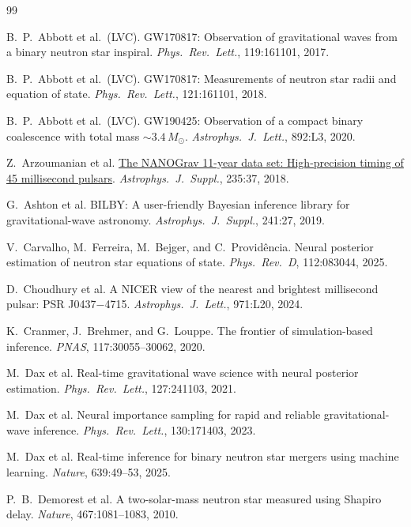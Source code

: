 \documentclass{article}
\newcommand{\Msun}{M_\odot}
\begin{document}
\begin{thebibliography}{99}\small\setlength\itemsep{0pt}

 B.~P.~Abbott et al.\ (LVC). GW170817: Observation of gravitational waves from a binary neutron star inspiral. \emph{Phys.\ Rev.\ Lett.}, 119:161101, 2017.

 B.~P.~Abbott et al.\ (LVC). GW170817: Measurements of neutron star radii and equation of state. \emph{Phys.\ Rev.\ Lett.}, 121:161101, 2018.

 B.~P.~Abbott et al.\ (LVC). GW190425: Observation of a compact binary coalescence with total mass $\sim3.4\,\Msun$. \emph{Astrophys.\ J.\ Lett.}, 892:L3, 2020.

 Z.~Arzoumanian et al. \href{https://doi.org/10.3847/1538-4365/aab5b0}{The NANOGrav 11-year data set: High-precision timing of 45 millisecond pulsars}. \emph{Astrophys.\ J.\ Suppl.}, 235:37, 2018.

 G.~Ashton et al. BILBY: A user-friendly Bayesian inference library for gravitational-wave astronomy. \emph{Astrophys.\ J.\ Suppl.}, 241:27, 2019.

 V.~Carvalho, M.~Ferreira, M.~Bejger, and C.~Provid\^encia. Neural posterior estimation of neutron star equations of state. \emph{Phys.\ Rev.\ D}, 112:083044, 2025.

 D.~Choudhury et al. A NICER view of the nearest and brightest millisecond pulsar: PSR J0437$-$4715. \emph{Astrophys.\ J.\ Lett.}, 971:L20, 2024.

 K.~Cranmer, J.~Brehmer, and G.~Louppe. The frontier of simulation-based inference. \emph{PNAS}, 117:30055--30062, 2020.

 M.~Dax et al. Real-time gravitational wave science with neural posterior estimation. \emph{Phys.\ Rev.\ Lett.}, 127:241103, 2021.

 M.~Dax et al. Neural importance sampling for rapid and reliable gravitational-wave inference. \emph{Phys.\ Rev.\ Lett.}, 130:171403, 2023.

 M.~Dax et al. Real-time inference for binary neutron star mergers using machine learning. \emph{Nature}, 639:49--53, 2025.

 P.~B.~Demorest et al. A two-solar-mass neutron star measured using Shapiro delay. \emph{Nature}, 467:1081--1083, 2010.


\end{thebibliography}
\end{document}
